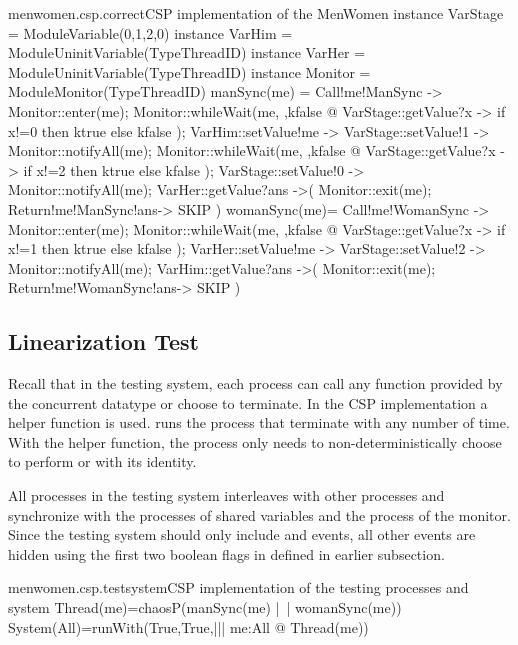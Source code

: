 \documentclass{article}
\begin{document}
\begin{cspfloat}{menwomen.csp.correct}{CSP implementation of the MenWomen}
instance VarStage = ModuleVariable({0,1,2},0) 
instance VarHim = ModuleUninitVariable(TypeThreadID)
instance VarHer = ModuleUninitVariable(TypeThreadID)
instance Monitor = ModuleMonitor(TypeThreadID)
manSync(me) = 
  Call!me!ManSync ->
  Monitor::enter(me);
    Monitor::whileWait(me, \ktrue,kfalse @
      VarStage::getValue?x ->
      if x!=0 then ktrue else kfalse
    );
    VarHim::setValue!me ->
    VarStage::setValue!1 ->
    Monitor::notifyAll(me);
    Monitor::whileWait(me, \ktrue,kfalse @
      VarStage::getValue?x ->
      if x!=2 then ktrue else kfalse
    );
    VarStage::setValue!0 ->
    Monitor::notifyAll(me);
    VarHer::getValue?ans ->(
  Monitor::exit(me);
  Return!me!ManSync!ans->
  SKIP
  )
womanSync(me)=
  Call!me!WomanSync ->
  Monitor::enter(me);
    Monitor::whileWait(me, \ktrue,kfalse @
      VarStage::getValue?x ->
      if x!=1 then ktrue else kfalse
    );
    VarHer::setValue!me ->
    VarStage::setValue!2 ->
    Monitor::notifyAll(me);
    VarHim::getValue?ans ->(
  Monitor::exit(me);
  Return!me!WomanSync!ans->
  SKIP
  )
\end{cspfloat}


\subsection{Linearization Test}

Recall that in the testing system, each process can call any function provided by the concurrent datatype or choose to terminate. In the CSP implementation a helper function is used.  runs the process  that terminate with  any number of time. With the helper function, the process  only needs to non-deterministically choose to perform  or  with its identity.

All processes in the testing system interleaves with other processes and synchronize with the processes of shared variables and the process of the monitor. Since the testing system should only include  and  events, all other events are hidden using the first two boolean flags in  defined in earlier subsection. 
\begin{cspinline}{menwomen.csp.testsystem}{CSP implementation of the testing processes and system}
Thread(me)=chaosP(manSync(me) |~| womanSync(me))
System(All)=runWith(True,True,||| me:All @ Thread(me))
\end{cspinline}
\end{document}
